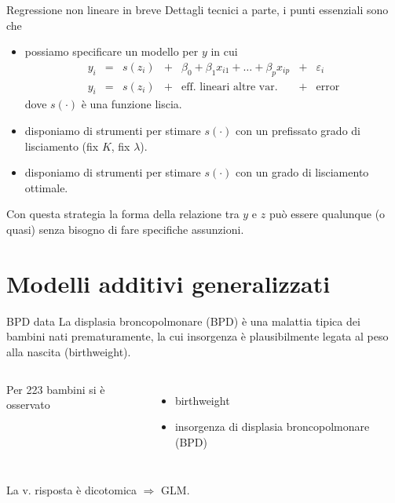 \documentclass{beamer}\usepackage[]{graphicx}\usepackage[]{color}
\makeatletter
\newenvironment{kframe}{%
 \def\at@end@of@kframe{}%
 \ifinner\ifhmode%
  \def\at@end@of@kframe{\end{minipage}}%
  \begin{minipage}{\columnwidth}%
 \fi\fi%
 \def\FrameCommand##1{\hskip\@totalleftmargin \hskip-\fboxsep
 \colorbox{shadecolor}{##1}\hskip-\fboxsep
     \hskip-\linewidth \hskip-\@totalleftmargin \hskip\columnwidth}%
 \MakeFramed {\advance\hsize-\width
   \@totalleftmargin\z@ \linewidth\hsize
   \@setminipage}}%
 {\par\unskip\endMakeFramed%
 \at@end@of@kframe}
\newenvironment{knitrout}{}{} %
\makeatother
\begin{document}
\begin{frame}{Regressione non lineare in breve}
Dettagli tecnici a parte, i punti essenziali sono che
\begin{itemize}
\item 
possiamo specificare un modello per $y$ in cui
\[
\begin{matrix}
y_i &=& s(z_i) &+& \beta_0 + \beta_1 x_{i1} + \ldots + \beta_p x_{ip} &+& \varepsilon_i \\
y_i &=& s(z_i) &+&  \mbox{eff. lineari altre var.}                     &+& \mbox{error} 
\end{matrix}
\]
dove $s(\cdot)$ \`e una funzione liscia.
\item
disponiamo di strumenti per stimare $s(\cdot)$ con un prefissato grado di lisciamento (fix $K$, fix $\lambda$).
\item
disponiamo di strumenti per stimare $s(\cdot)$ con un grado di lisciamento ottimale.
\end{itemize}
Con questa strategia la forma della relazione tra $y$ e $z$ pu\`o essere qualunque (o quasi) senza bisogno di fare specifiche assunzioni.
\end{frame}


\section[GAM]{Modelli additivi generalizzati}

\begin{frame}{BPD data}
La displasia broncopolmonare (BPD) \`e una malattia tipica dei bambini nati prematuramente, la cui insorgenza \`e plausibilmente legata al peso alla nascita (birthweight).

\begin{columns}
Per 223 bambini si \`e osservato
\begin{itemize}
\item birthweight
\item insorgenza di displasia broncopolmonare (BPD)
\end{itemize}
\begin{knitrout}
\color{fgcolor}\begin{kframe}


{\ttfamily\noindent\bfseries{}}\end{kframe}
\end{knitrout}
\end{columns}

La v. risposta \`e dicotomica $\Rightarrow$ GLM.
\end{frame}
\end{document}
